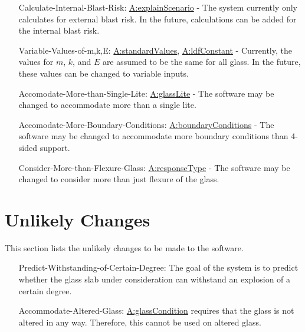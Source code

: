 \documentclass[12pt]{article}
\begin{document}
\begin{itemize}
\item[Calculate-Internal-Blast-Risk:\phantomsection\label{calcInternalBlastRisk}]{\hyperref[assumpES]{A:explainScenario} - The system currently only calculates for external blast risk. In the future, calculations can be added for the internal blast risk.}
\item[Variable-Values-of-m,k,E:\phantomsection\label{varValsOfmkE}]{\hyperref[assumpSV]{A:standardValues}, \hyperref[assumpLDFC]{A:ldfConstant} - Currently, the values for $m$, $k$, and $E$ are assumed to be the same for all glass. In the future, these values can be changed to variable inputs.}
\item[Accomodate-More-than-Single-Lite:\phantomsection\label{accMoreThanSingleLite}]{\hyperref[assumpGL]{A:glassLite} - The software may be changed to accommodate more than a single lite.}
\item[Accomodate-More-Boundary-Conditions:\phantomsection\label{accMoreBoundaryConditions}]{\hyperref[assumpBC]{A:boundaryConditions} - The software may be changed to accommodate more boundary conditions than 4-sided support.}
\item[Consider-More-than-Flexure-Glass:\phantomsection\label{considerMoreThanFlexGlass}]{\hyperref[assumpRT]{A:responseType} - The software may be changed to consider more than just flexure of the glass.}
\end{itemize}
\section{Unlikely Changes}
\label{Sec:UCs}
This section lists the unlikely changes to be made to the software.

\begin{itemize}
\item[Predict-Withstanding-of-Certain-Degree:\phantomsection\label{predictWithstandOfCertDeg}]{The goal of the system is to predict whether the glass slab under consideration can withstand an explosion of a certain degree.}
\item[Accommodate-Altered-Glass:\phantomsection\label{accAlteredGlass}]{\hyperref[assumpGC]{A:glassCondition} requires that the glass is not altered in any way. Therefore, this cannot be used on altered glass.}
\end{itemize}
\end{document}
